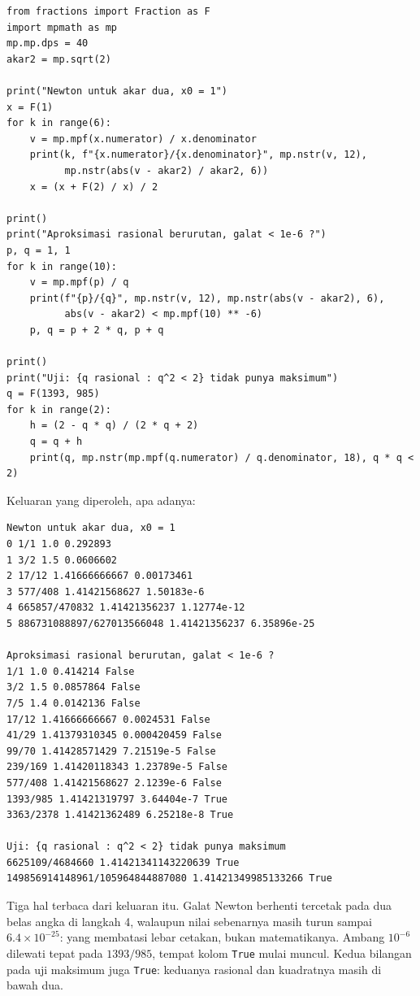 \begin{lab}
\begin{verbatim}
from fractions import Fraction as F
import mpmath as mp
mp.mp.dps = 40
akar2 = mp.sqrt(2)

print("Newton untuk akar dua, x0 = 1")
x = F(1)
for k in range(6):
    v = mp.mpf(x.numerator) / x.denominator
    print(k, f"{x.numerator}/{x.denominator}", mp.nstr(v, 12),
          mp.nstr(abs(v - akar2) / akar2, 6))
    x = (x + F(2) / x) / 2

print()
print("Aproksimasi rasional berurutan, galat < 1e-6 ?")
p, q = 1, 1
for k in range(10):
    v = mp.mpf(p) / q
    print(f"{p}/{q}", mp.nstr(v, 12), mp.nstr(abs(v - akar2), 6),
          abs(v - akar2) < mp.mpf(10) ** -6)
    p, q = p + 2 * q, p + q

print()
print("Uji: {q rasional : q^2 < 2} tidak punya maksimum")
q = F(1393, 985)
for k in range(2):
    h = (2 - q * q) / (2 * q + 2)
    q = q + h
    print(q, mp.nstr(mp.mpf(q.numerator) / q.denominator, 18), q * q < 2)
\end{verbatim}
\end{lab}

Keluaran yang diperoleh, apa adanya:

\begin{verbatim}
Newton untuk akar dua, x0 = 1
0 1/1 1.0 0.292893
1 3/2 1.5 0.0606602
2 17/12 1.41666666667 0.00173461
3 577/408 1.41421568627 1.50183e-6
4 665857/470832 1.41421356237 1.12774e-12
5 886731088897/627013566048 1.41421356237 6.35896e-25

Aproksimasi rasional berurutan, galat < 1e-6 ?
1/1 1.0 0.414214 False
3/2 1.5 0.0857864 False
7/5 1.4 0.0142136 False
17/12 1.41666666667 0.0024531 False
41/29 1.41379310345 0.000420459 False
99/70 1.41428571429 7.21519e-5 False
239/169 1.41420118343 1.23789e-5 False
577/408 1.41421568627 2.1239e-6 False
1393/985 1.41421319797 3.64404e-7 True
3363/2378 1.41421362489 6.25218e-8 True

Uji: {q rasional : q^2 < 2} tidak punya maksimum
6625109/4684660 1.41421341143220639 True
149856914148961/105964844887080 1.41421349985133266 True
\end{verbatim}

Tiga hal terbaca dari keluaran itu. Galat Newton berhenti tercetak pada dua belas angka
di langkah 4, walaupun nilai sebenarnya masih turun sampai $6.4\times10^{-25}$: yang
membatasi lebar cetakan, bukan matematikanya. Ambang $10^{-6}$ dilewati tepat pada
$1393/985$, tempat kolom \texttt{True} mulai muncul. Kedua bilangan pada uji maksimum
juga \texttt{True}: keduanya rasional dan kuadratnya masih di bawah dua.

